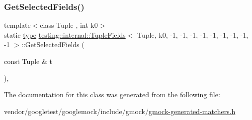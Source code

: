 \subsubsection{\texorpdfstring{Get\+Selected\+Fields()}{GetSelectedFields()}}
{\footnotesize\ttfamily template$<$class Tuple , int k0$>$ \\
static \hyperlink{classtesting_1_1internal_1_1_tuple_fields_3_01_tuple_00_01k0_00_01-1_00_01-1_00_01-1_00_01-1_00_079b3e59a7bb10f5d0d7a5843be2be9d_aeb08130cf9faa6f43e0453d2c6d9fd04}{type} \hyperlink{classtesting_1_1internal_1_1_tuple_fields}{testing\+::internal\+::\+Tuple\+Fields}$<$ Tuple, k0, -\/1, -\/1, -\/1, -\/1, -\/1, -\/1, -\/1, -\/1, -\/1 $>$\+::Get\+Selected\+Fields (\begin{DoxyParamCaption}\item[{const Tuple \&}]{t }\end{DoxyParamCaption})\hspace{0.3cm}{\ttfamily [inline]}, {\ttfamily [static]}}



The documentation for this class was generated from the following file\+:\begin{DoxyCompactItemize}
\item 
vendor/googletest/googlemock/include/gmock/\hyperlink{gmock-generated-matchers_8h}{gmock-\/generated-\/matchers.\+h}\end{DoxyCompactItemize}

